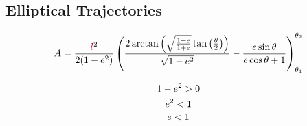 \subsection{Elliptical Trajectories}
$$A=\frac{\textcolor{purple}{l}^2}{2(1-\textcolor{black}{e}^2)} \left(
\frac{2\arctan\left(\sqrt{\frac{1-\textcolor{black}{e}}{1+\textcolor{black}{e}}}\tan{\left(\frac{\theta}{2}\right)}\right)}{\sqrt{1-\textcolor{black}{e}^2}}
-\frac{\textcolor{black}{e}\sin{\theta}}{\textcolor{black}{e}\cos{\theta}+1}\right)_{\theta_1}^{\theta_2}$$

$$1-\textcolor{black}{e}^2>0$$
$$\textcolor{black}{e}^2<1$$
$$\textcolor{black}{e}<1$$